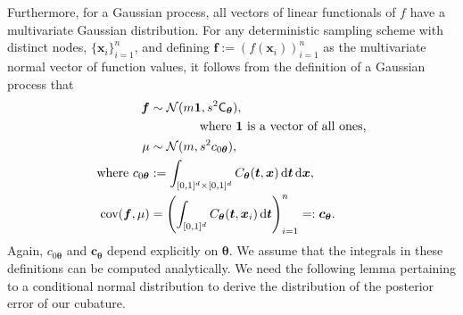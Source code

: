 \documentclass[twocolumn]{svjour3}          %
\newcommand{\bm}[1]{\boldsymbol{#1}}
\newcommand{\dif}[1]{\text{d}{#1}}
\newcommand{\D}[1]{\text{d}{#1}}
\newcommand{\vtheta}{{\bm{\theta}}}
\newcommand{\vc}{\bm{c}}
\newcommand{\vf}{\bm{f}}
\newcommand{\vt}{\bm{t}}
\newcommand{\vx}{\bm{x}}
\newcommand{\vone}{\bm{1}}
\newcommand{\mCtheta}{{\mathsf{C}_{\vtheta}}}
\newcommand{\cov}{{\textup{cov}}}
\newcommand{\calN}{\mathcal{N}}
\begin{document}
Furthermore, for a Gaussian process, all vectors of linear functionals of $f$ have a multivariate Gaussian distribution. For any deterministic sampling scheme with distinct nodes, $\{\vx_i\}_{i=1}^n$, and defining  $\vf  := \left( f(\vx_i)\right)_{i=1}^n$ as the multivariate normal vector of function values, it follows from the definition of a Gaussian process that 
\begin{subequations} \label{eqn:fGaussDist}
\begin{align}
\vf  & \sim \calN(m \vone, s^2 \mCtheta), \\
\nonumber & \qquad \qquad \text{where $\vone$ is a vector of all ones,}\\
\mu & \sim \calN(m, s^2 c_{0\vtheta}), 
\\
\text{where }
c_{0\vtheta} &:= \int_{[0,1]^{d}\times [0,1]^{d}} C_\vtheta(\vt,\vx) \, \dif{\vt} \, \dif{\vx}, \\
\cov(\vf, \mu) &= \left(  \int_{[0,1]^d} C_\vtheta(\vt,\vx_i) \, \D \vt \right)_{i=1}^n  =: \vc_\vtheta.
\end{align}
\end{subequations}
Again, $c_{0\vtheta}$ and $\vc_\vtheta$ depend explicitly on $\vtheta$.  We assume that the integrals in these definitions can be computed analytically.  We need the following lemma pertaining to a conditional normal distribution to derive the distribution of the posterior error of our cubature. 
\end{document}
